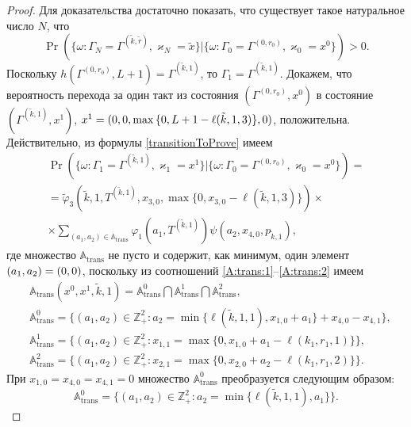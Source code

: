 \begin{proof}
Для доказательства достаточно показать,  что
существует такое натуральное число $N$,  что 
\begin{equation*}
\Pr(\{\omega\colon \Gamma_{N}=\Gamma^{(\tilde{k},  \tilde{r} )},  \varkappa_{N}=\tilde{x}\}|\{\omega\colon 
\Gamma_{0}=\Gamma^{(0,  r_0)},  \varkappa_{0}=x^0\})>0.
\end{equation*}
Поскольку $h(\Gamma^{(0,  r_0)},  L+1) = \Gamma^{(\tilde{k},  1)}$,  то $\Gamma_1 = \Gamma^{(\tilde{k},  1)}$. Докажем,  что вероятность перехода за один такт из состояния $(\Gamma^{(0,  r_0)},  x^0)$ в состояние $(\Gamma^{(\tilde{k},  1)},  x^1)$,  $x^1 \hm= (0,  0,  \max{\{0,  L+1-\ell(\tilde{k},  1,  3)\}},  0)$,  положительна.
Действительно,  из формулы \eqref{transitionToProve} имеем
\begin{multline*}
\Pr(\{\omega\colon \Gamma_{1}=\Gamma^{(\tilde{k},  1)},  \varkappa_{1}=x^1\}|\{\omega\colon 
\Gamma_{0}=\Gamma^{(0,  r_0)},  \varkappa_{0}=x^0\})=\\
=\widetilde{\varphi}_3(\tilde{k},  1,  T^{(\tilde{k},  1)},  x_{3,  0}, \max{\{0,  x_{3,  0} - \ell(\tilde{k},  1,  3)\}}) \times \\ \times
\sum_{(a_1,  a_2)\in {\mathbb A}_{\mathrm{trans}}}\varphi_1(a_1,  T^{(\tilde{k},  1)})  \psi(a_2,  x_{4,  0},  p_{\tilde{k},  1}), 
\end{multline*}
где множество ${\mathbb A}_{\mathrm{trans}}$ не пусто и содержит,  как минимум,  один элемент $(a_1,  a_2)\hm=(0,  0)$,  поскольку из соотношений \eqref{A:trans:1}--\eqref{A:trans:2} имеем
\begin{align*}
&{\mathbb A}_{\mathrm{trans}}(x^0,  x^1, \tilde{k},  1) = {\mathbb A}_{\mathrm{trans}}^0 \bigcap {\mathbb A}_{\mathrm{trans}}^1\bigcap {\mathbb A}_{\mathrm{trans}}^2, \\
&{\mathbb A}_{\mathrm{trans}}^0 = \{(a_1,  a_2) \in \mathbb{Z}_+^2 \colon a_2 = \min{\{\ell(\tilde{k},  1,  1),  x_{1,  0}+a_1}\} +x_{4,  0}- x_{4,  1}\}, \\
&{\mathbb A}_{\mathrm{trans}}^1 = \{(a_1,  a_2) \in \mathbb{Z}_+^2 \colon x_{1,  1}=\max{\{0, x_{1,  0}+a_1-\ell(k_1,  r_1,  1)\}}\}, \\
& {\mathbb A}_{\mathrm{trans}}^2 = \{(a_1,  a_2) \in \mathbb{Z}_+^2 \colon  x_{2,  1} =\max{\{0, x_{2,  0}+a_2-\ell(k_1,  r_1,  2)\}}\}.
\end{align*}
При $x_{1,  0} = x_{4,  0} = x_{4,  1} = 0$ множество ${\mathbb A}_{\mathrm{trans}}^0$ преобразуется следующим образом:
$$
{\mathbb A}_{\mathrm{trans}}^0 = \{(a_1,  a_2) \in \mathbb{Z}_+^2 \colon a_2 = \min{\{\ell(\tilde{k},  1,  1),  a_1}\}\}.
$$
\end{proof}
